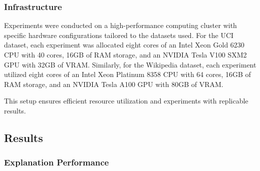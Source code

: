 




% 


\subsubsection{Infrastructure}
\label{s_Evaluation_Setup_Infrastructure}
Experiments were conducted on a high-performance computing cluster with specific hardware configurations tailored to the datasets used. For the UCI dataset, each experiment was allocated eight cores of an Intel Xeon Gold 6230 CPU with 40 cores, 16GB of RAM storage, and an NVIDIA Tesla V100 SXM2 GPU with 32GB of VRAM. Similarly, for the Wikipedia dataset, each experiment utilized eight cores of an Intel Xeon Platinum 8358 CPU with 64 cores, 16GB of RAM storage, and an NVIDIA Tesla A100 GPU with 80GB of VRAM.

This setup ensures efficient resource utilization and experiments with replicable results.

\subsection{Results}
\label{s_Evaluation_Results}

\subsubsection{Explanation Performance}
\label{s_Evaluation_Results_Performance}


